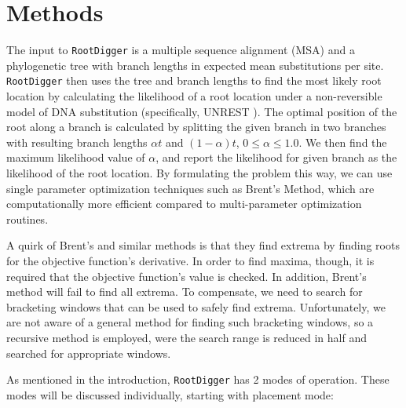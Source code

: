 \documentclass{article}
\newcommand{\RootDiggertt}{\texttt{RootDigger}}
\begin{document}
\section{Methods}

The input to \RootDiggertt{} is a multiple sequence alignment (MSA) and a
phylogenetic tree with branch lengths in expected mean substitutions per site.
\RootDiggertt{} then uses the tree and branch lengths to find the most likely
root location by calculating the likelihood of a root location under a
non-reversible model of DNA substitution (specifically, UNREST
\cite{yang_estimating_1994}). The optimal position of the root along a branch is
calculated by splitting the given branch in two branches with resulting branch
lengths $\alpha t$ and $(1-\alpha) t$, $0 \leq \alpha \leq 1.0$.  We then find
the maximum likelihood value of $\alpha$, and report the likelihood for given
branch as the likelihood of the root location.  By formulating the problem this
way, we can use single parameter optimization techniques such as Brent's
Method\footnotemark{}, which are computationally more efficient compared to
multi-parameter optimization routines.


A quirk of Brent's and similar methods is that they find extrema by finding
roots for the objective function's derivative. In order to find maxima, though,
it is required that the objective function's value is checked. In addition,
Brent's method will fail to find all extrema.  To compensate, we need to search
for bracketing windows that can be used to safely find extrema.  Unfortunately,
we are not aware of a general method for finding such bracketing windows, so a
recursive method is employed, were the search range is reduced in half and
searched for appropriate\footnotemark{} windows.


As mentioned in the introduction, \RootDiggertt{} has 2 modes of operation.
These modes will be discussed individually, starting with placement mode:
\end{document}
